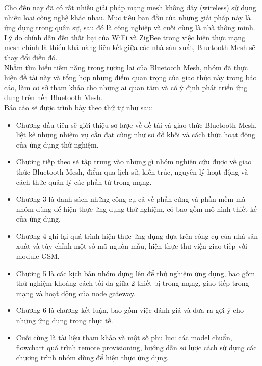 Cho đến nay đã có rất nhiều giải pháp mạng mesh không dây (wireless) sử dụng nhiều loại công nghệ khác nhau. Mục tiêu ban đầu của những giải pháp này là ứng dụng trong quân sự, sau đó là công nghiệp và cuối cùng là nhà thông minh. Lý do chính dẫn đến thất bại của WiFi và ZigBee trong việc hiện thực mạng mesh chính là thiếu khả năng liên kết giữa các nhà sản xuất, Bluetooth Mesh sẽ thay đổi điều đó\cite{meshadvan}.\\

Nhằm tìm hiểu tiềm năng trong tương lai của Bluetooth Mesh, nhóm đã thực hiện đề tài này và tổng hợp những điểm quan trọng của giao thức này trong báo cáo, làm cơ sở tham khảo cho những ai quan tâm và có ý định phát triển ứng dụng trên nền Bluetooth Mesh.\\

Báo cáo sẽ được trình bày theo thứ tự như sau:
    \begin{itemize}
        \item Chương đầu tiên sẽ giới thiệu sơ lược về đề tài và giao thức Bluetooth Mesh, liệt kê những nhiệm vụ cần đạt cũng như sơ đồ khối và cách thức hoạt động của ứng dụng thử nghiệm.
        \item Chương tiếp theo sẽ tập trung vào những gì nhóm nghiên cứu được về giao thức Bluetooth Mesh, điểm qua lịch sử, kiến trúc, nguyên lý hoạt động và cách thức quản lý các phần tử trong mạng.
        \item Chương 3 là danh sách những công cụ cả về phần cứng và phần mềm mà nhóm dùng để hiện thực ứng dụng thử nghiệm, có bao gồm mô hình thiết kế của ứng dụng.
        \item Chương 4 ghi lại quá trình hiện thực ứng dụng dựa trên công cụ của nhà sản xuất và tùy chỉnh một số mã nguồn mẫu, hiện thực thư viện giao tiếp với module GSM.
        \item Chương 5 là các kịch bản nhóm dựng lên để thử nghiệm ứng dụng, bao gồm thử nghiệm khoảng cách tối đa giữa 2 thiết bị trong mạng, giao tiếp trong mạng và hoạt động của node gateway.
        \item Chương 6 là chương kết luận, bao gồm việc đánh giá và đưa ra gợi ý cho những ứng dụng trong thực tế.
        \item Cuối cùng là tài liệu tham khảo và một số phụ lục: các model chuẩn, flowchart quá trình remote provisioning, hướng dẫn sơ lược cách sử dụng các chương trình nhóm dùng để hiện thực ứng dụng.
    \end{itemize}

